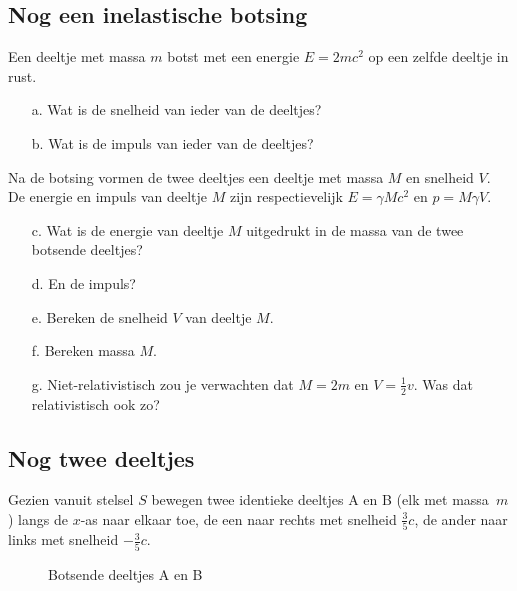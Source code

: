 \subsection{Nog een inelastische botsing}
Een deeltje met massa $m$ botst met een energie $E = 2mc^{2}$ op 
een zelfde deeltje in rust.
\begin{itemize}
\item [a.]
Wat is de snelheid van ieder van de deeltjes?
\item [b.]
Wat is de impuls van ieder van de deeltjes?
\end{itemize}
Na de botsing vormen de twee deeltjes een deeltje met massa $M$ en snelheid
$V$. 
De energie en impuls van deeltje $M$ zijn respectievelijk
$E = \gamma Mc^{2}$ en $p = M\gamma V$.
\begin{itemize}
\item [c.]
Wat is de energie van deeltje $M$ uitgedrukt in de massa van de twee
botsende deeltjes?
\item [d.]
En de impuls?
\item [e.]
Bereken de snelheid $V$ van deeltje $M$.
\item [f.]
Bereken massa $M$.
\item [g.]
Niet-relativistisch zou je verwachten dat $M = 2m$ en $V = \frac{1}{2}v$.
Was dat relativistisch ook zo?
\end{itemize}

\subsection{Nog twee deeltjes}

Gezien vanuit stelsel $S$ bewegen twee identieke deeltjes A en B (elk met massa~$m$) langs de $x$-as naar elkaar toe, de een naar rechts met snelheid $\frac{3}{5}c$, de ander naar links met snelheid $-\frac{3}{5}c$.\\
	
	
 \begin{figure} [h]
 \begin{center}
 \mbox{\epsfxsize=10cm}
 \caption{Botsende deeltjes A en B}
 \label{f:BdAB}
 \end{center}
 \end{figure}
	
